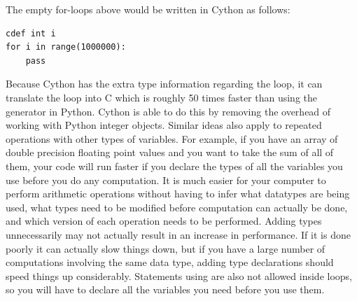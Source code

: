 The empty for-loops above would be written in Cython as follows:
\begin{lstlisting}
cdef int i
for i in range(1000000):
    pass
\end{lstlisting}
Because Cython has the extra type information regarding the loop, it can translate the loop into C which is roughly 50 times faster than using the generator in Python.
Cython is able to do this by removing the overhead of working with Python integer objects.
Similar ideas also apply to repeated operations with other types of variables.
For example, if you have an array of double precision floating point values and you want to take the sum of all of them, your code will run faster if you declare the types of all the variables you use before you do any computation.
It is much easier for your computer to perform arithmetic operations without having to infer what datatypes are being used, what types need to be modified before computation can actually be done, and which version of each operation needs to be performed.
Adding types unnecessarily may not actually result in an increase in performance. If it is done poorly it can actually slow things down, but if you have a large number of computations involving the same data type, adding type declarations should speed things up considerably.
Statements using  are also not allowed inside loops, so you will have to declare all the variables you need before you use them.

